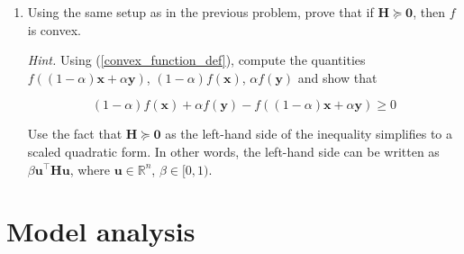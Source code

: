 \documentclass{article}
\numberwithin{equation}{section}
\begin{document}
\begin{enumerate}
    \item
    Using the same setup as in the previous problem, prove that if
    $ \mathbf{H} \succeq \mathbf{0} $, then $ f $ is convex.

    \medskip

    \textit{Hint.} Using (\ref{convex_function_def}), compute the quantities
    $ f((1 - \alpha)\mathbf{x} + \alpha\mathbf{y}) $,
    $ (1 - \alpha)f(\mathbf{x}) $, $ \alpha f(\mathbf{y}) $ and show that

    \begin{equation*}
        (1 - \alpha)f(\mathbf{x}) + \alpha f(\mathbf{y}) -
        f((1 - \alpha)\mathbf{x} + \alpha\mathbf{y}) \ge 0
    \end{equation*}

    Use the fact that $ \mathbf{H} \succeq \mathbf{0} $ as the left-hand side
    of the inequality simplifies to a scaled quadratic form. In other words,
    the left-hand side can be written as $ \beta\mathbf{u}^\top\mathbf{Hu} $,
    where $ \mathbf{u} \in \mathbb{R}^n $, $ \beta \in [0, 1) $.

\end{enumerate}

\section{Model analysis}
\end{document}

